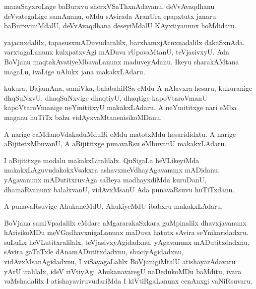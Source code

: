 \documentclass{article}
\begin{document}
\begin{mn}
manuSayxroLage baBurxvu sherxVSaThxnAdavanu, deVvAvaqdhanu
deVvategaLige samAnanu, oMdu sAvirada AranUra epapxtutx janaru
baBurxviniMdalU, deVvAvaqdhana deseyiMdalU KAyxtiyanunx hoMdidaru.
\end{mn}

\begin{mn}%
yajacnxdalilx, tapasusxmADuvudaralilx, barxhamxjAcnxnadalilx
dakaSxnAda. varxtagaLanunx kulxpatxvAgi mADuva rUpavaMtanU,
teVjasivxyU. Ada BoVjanu maqtakAvatiyeMbavaLanunx maduveyAdanu. Ikeyu
sharakAMtana magaLu, ivaLige nAlukx jana makakxLAdaru.
\end{mn}

\begin{mn}%
kukura, BajamAna, samiVka, balabahiRSa eMdu A nAlavxra hesaru,
kukuranige dhqSuNxvU, dhaqSuNxvige dhaqtiyU, dhaqtige kapoVtaroVmanU
kapoVtaroVmanige neYmititxyU makakxLAdaru. A neYmititxge nari eMba
maganu huTiTx bahu vidAyxvaMtanenisikoMDanu.
\end{mn}

\begin{mn}%
A narige caMdanoVdakaduMduBi eMdu matotxMdu hesarididxtu. A narige
aBijitetxMbuvanU, A aBijititxge punavaRsu eMbuvanU makakxLAdaru.
\end{mn}

\begin{mn}%
I aBijititxge modalu makakxLiralilalx. QuSigaLa heVLikeyiMda
makakxLAguvudakokxVsakxra ashavxmeVdhayAgavanunx mADidanu. yAgavanunx
mADutitxruvAga saBeya madhayxdiMda kuruDanU, dhamaRvanunx balalxvanU,
vidAvxMsanU Ada punavaRsuvu huTiTxdanu.
\end{mn}

\begin{mn}
A punavaRsuvige AhukaneMdU, AhukiyeMdU ibabxru makakxLAdaru.
\end{mn}

\begin{mn}%
BoVjana samiVpadalilx eMdare aMgararakaSxkara guMpinalilx
dhavxjavanunx hArisikoMDu meVGadhavxnigaLanunx maDuva hatutx sAvira
seYnikaridadxru. suLuLx heVLutitxralilalx,
teVjasivxyAgidadxnu. yAgavanunx mADutitxdadxnu, sAvira gaTaTxle
dAnamADutitxdadxnu, shuciyAgidadxnu, vidAvxMsanAgidadxnu, I
viSayagaLalilx BoVjanigiMtalU atishayarAdavaru yArU iralilalx, ideV
riVtiyAgi AhukanavaregU naDedukoMDu baMditu, ivara vaMshadalilx I
atishayaviruvudariMda I kiVtiRgaLanunx cenAnxgi vaNiRsuvaru.
\end{mn}
\end{document}
